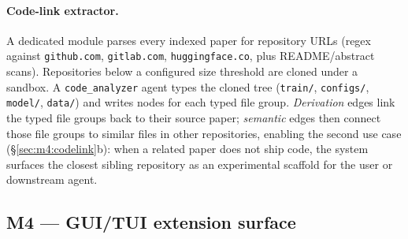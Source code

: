 \documentclass{article}
\newcommand{\code}[1]{\texttt{\small #1}}
\begin{document}
\paragraph{Code-link extractor.}
\label{sec:codelink}
A dedicated module parses every indexed paper for repository URLs
(regex against \code{github.com}, \code{gitlab.com},
\code{huggingface.co}, plus README/abstract scans).
Repositories below a configured size threshold are cloned under a
sandbox. A \code{code\_analyzer} agent types the cloned tree
(\code{train/}, \code{configs/}, \code{model/}, \code{data/}) and writes
nodes for each typed file group. \emph{Derivation} edges link the typed
file groups back to their source paper; \emph{semantic} edges then
connect those file groups to similar files in other repositories,
enabling the second use case (\S\ref{sec:m4:codelink}b): when a related
paper does not ship code, the system surfaces the closest sibling
repository as an experimental scaffold for the user or downstream
agent.

\subsection{M4 --- GUI/TUI extension surface}
\label{sec:guitui}
\end{document}

